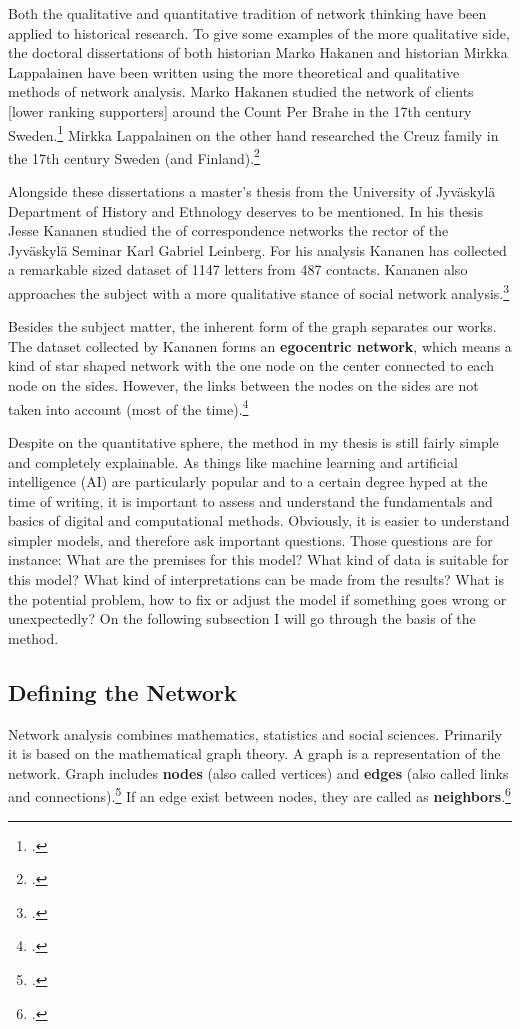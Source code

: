 Both the qualitative and quantitative tradition of network thinking have been applied to historical research. To give some examples of the more qualitative side, the doctoral dissertations of both historian Marko Hakanen and historian Mirkka Lappalainen have been written using the more theoretical and qualitative methods of network analysis. Marko Hakanen studied the network of clients [lower ranking supporters] around the Count Per Brahe in the 17th century Sweden.\footcite{hakanen11} Mirkka Lappalainen on the other hand researched the Creuz family in the 17th century Sweden (and Finland).\footcite{lappalainen05}

Alongside these dissertations a master's thesis from the University of Jyväskylä Department of History and Ethnology deserves to be mentioned. In his thesis Jesse Kananen studied the of correspondence networks the rector of the Jyväskylä Seminar Karl Gabriel Leinberg. For his analysis Kananen has collected a remarkable sized dataset of 1147 letters from 487 contacts. Kananen also approaches the subject with a more qualitative stance of social network analysis.\footcite{kananen18}

Besides the subject matter, the inherent form of the graph separates our works. The dataset collected by Kananen forms an \textbf{egocentric network}, which means a kind of star shaped network with the one node on the center connected to each node on the sides. However, the links between the nodes on the sides are not taken into account (most of the time).\footcite[pp. 22-23.]{kananen18}

Despite on the quantitative sphere, the method in my thesis is still fairly simple and completely explainable. As things like machine learning and artificial intelligence (AI) are particularly popular and to a certain degree hyped at the time of writing, it is important to assess and understand the fundamentals and basics of digital and computational methods. Obviously, it is easier to understand simpler models, and therefore ask important questions. Those questions are for instance: What are the premises for this model? What kind of data is suitable for this model? What kind of interpretations can be made from the results? What is the potential problem, how to fix or adjust the model if something goes wrong or unexpectedly? On the following subsection I will go through the basis of the method.

\subsection{Defining the Network}
\label{network}
Network analysis combines mathematics, statistics and social sciences. Primarily it is based on the mathematical graph theory. A graph is a representation of the network. Graph includes \textbf{nodes} (also called vertices) and \textbf{edges} (also called links and connections).\footcites[p. 247, 248-249.]{huhtamakiEtAl}[pp. vi-vii]{RajPM2018a} If an edge exist between nodes, they are called as \textbf{neighbors}.\footcite[p. vii]{RajPM2018a}

